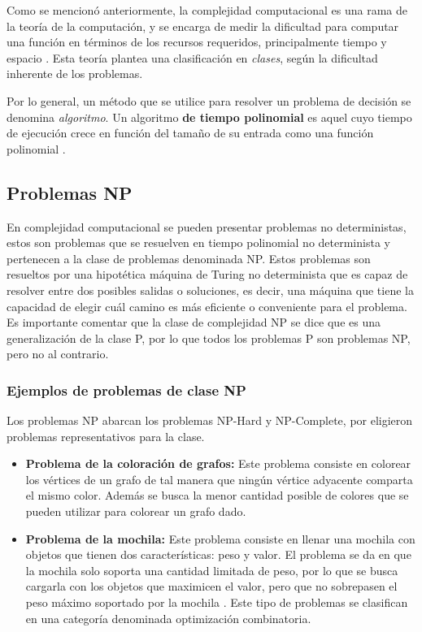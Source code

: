 Como se mencionó anteriormente, la complejidad computacional es una rama de la teoría de la computación, y se encarga de medir la dificultad para computar una función en términos de los recursos requeridos, principalmente tiempo y espacio \cite{R3}. Esta teoría plantea una clasificación en \emph{clases}, según la dificultad inherente de los problemas.

Por lo general, un método que se utilice para resolver un problema de decisión se denomina \textit{algoritmo}. Un algoritmo \textbf{de tiempo polinomial} es aquel cuyo tiempo de ejecución crece en función del tamaño de su entrada como una función polinomial \cite{R4}.

\subsection{Problemas NP}

En complejidad computacional se pueden presentar problemas no deterministas, estos son problemas que se resuelven en tiempo polinomial no determinista y pertenecen a la clase de problemas denominada NP. Estos problemas son resueltos por una hipotética máquina de Turing no determinista que es capaz de resolver entre dos posibles salidas o soluciones\cite{R8}, es decir, una máquina que tiene la capacidad de elegir cuál camino es más eficiente o conveniente para el problema. Es importante comentar que la clase de complejidad NP se dice que es una generalización de la clase P, por lo que todos los problemas P son problemas NP, pero no al contrario\cite{R6}.

\subsubsection{Ejemplos de problemas de clase NP}

Los problemas NP abarcan los problemas NP-Hard y NP-Complete, por eligieron problemas representativos para la clase.
\begin{itemize}
    \item \textbf{Problema de la coloración de grafos:} Este problema consiste en colorear los vértices de un grafo de tal manera que ningún vértice adyacente comparta el mismo color. Además se busca la menor cantidad posible de colores que se pueden utilizar para colorear un grafo dado\cite{R9}.
    
    \item \textbf{Problema de la mochila: } Este problema consiste en llenar una mochila con objetos que tienen dos características: peso y valor. El problema se da en que la mochila solo soporta una cantidad limitada de peso, por lo que se busca cargarla con los objetos que maximicen el valor, pero que no sobrepasen el peso máximo soportado por la mochila \cite{R9}. Este tipo de problemas se clasifican en una categoría denominada optimización combinatoria.
\end{itemize}

